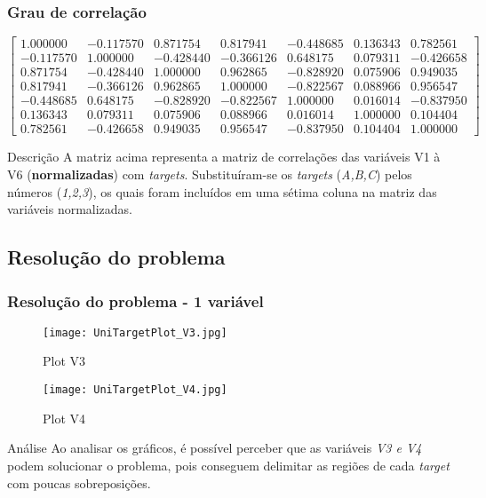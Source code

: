 \begin{frame}[shrink=30]
    \frametitle{Grau de correlação}
    \vspace{3em}
    \begin{equation*}
        \begin{bmatrix}
        1.000000 & -0.117570 &  0.871754 &  0.817941 & -0.448685 & 0.136343 &  0.782561 \\
        -0.117570 &  1.000000 & -0.428440 & -0.366126 &  0.648175 & 0.079311 & -0.426658 \\
        0.871754 & -0.428440 &  1.000000 &  0.962865 & -0.828920 & 0.075906 &  0.949035 \\
        0.817941 & -0.366126 &  0.962865 &  1.000000 & -0.822567 & 0.088966 &  0.956547 \\
        -0.448685 &  0.648175 & -0.828920 & -0.822567 &  1.000000 & 0.016014 & -0.837950 \\
        0.136343 &  0.079311 &  0.075906 &  0.088966 &  0.016014 & 1.000000 &  0.104404 \\
        0.782561 & -0.426658 &  0.949035 &  0.956547 & -0.837950 & 0.104404 &  1.000000 
        \end{bmatrix}
    \end{equation*}

    \begin{block}{Descrição}
        A matriz acima representa a matriz de correlações das variáveis V1 à V6 (\textbf{normalizadas}) com \emph{targets}. Substituíram-se os \emph{targets} (\textit{A,B,C}) pelos números (\textit{1,2,3}), os quais foram incluídos em uma sétima coluna na matriz das variáveis normalizadas.
    \end{block}
     
\end{frame}

\subsection[Subsection]{Resolução do problema}
\begin{frame}
    
    \frametitle{Resolução do problema - 1 variável}

    \begin{figure}[!tbp]
        \begin{minipage}[b]{0.45\textwidth}
            \texttt{[image: UniTargetPlot\_V3.jpg]}
            \caption{Plot V3}
        \end{minipage}
        \begin{minipage}[b]{0.45\textwidth}
            \texttt{[image: UniTargetPlot\_V4.jpg]}
            \caption{Plot V4}
        \end{minipage}
    \end{figure}

    \begin{block}{Análise}
        Ao analisar os gráficos, é possível perceber que as variáveis \textit{V3 e V4} podem solucionar o problema, pois conseguem delimitar as regiões de cada \textit{target} com poucas sobreposições.
    \end{block}

\end{frame}

